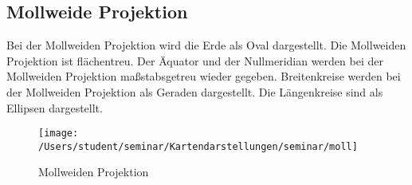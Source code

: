 \subsection{Mollweide Projektion}
\label{sec:Mollweiden}
Bei der Mollweiden Projektion wird die Erde als Oval dargestellt. Die Mollweiden Projektion ist flächentreu.
Der Äquator und der Nullmeridian werden bei der Mollweiden Projektion maßstabsgetreu wieder gegeben.
Breitenkreise werden bei der Mollweiden Projektion als Geraden dargestellt. Die Längenkreise sind als Ellipsen dargestellt.\\

\begin{figure}[hbtp]
\centering
\texttt{[image: /Users/student/seminar/Kartendarstellungen/seminar/moll]} \caption{Mollweiden Projektion}
\end{figure}
\newpage 